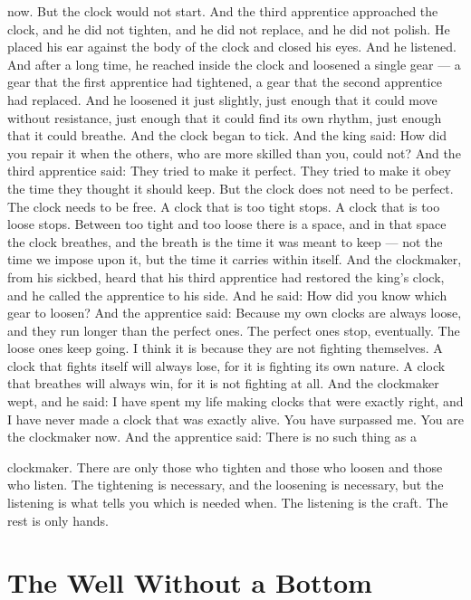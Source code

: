\documentclass[12pt,openany]{book}
\begin{document}
now. But the clock would not start. And the third apprentice approached the clock, and he did not tighten, and he did not replace, and he did not polish. He placed his ear against the body of the clock and closed his eyes. And he listened. And after a long time, he reached inside the clock and loosened a single gear --- a gear that the first apprentice had tightened, a gear that the second apprentice had replaced. And he loosened it just slightly, just enough that it could move without resistance, just enough that it could find its own rhythm, just enough that it could breathe. And the clock began to tick. And the king said: How did you repair it when the others, who are more skilled than you, could not? And the third apprentice said: They tried to make it perfect. They tried to make it obey the time they thought it should keep. But the clock does not need to be perfect. The clock needs to be free. A clock that is too tight stops. A clock that is too loose stops. Between too tight and too loose there is a space, and in that space the clock breathes, and the breath is the time it was meant to keep --- not the time we impose upon it, but the time it carries within itself. And the clockmaker, from his sickbed, heard that his third apprentice had restored the king's clock, and he called the apprentice to his side. And he said: How did you know which gear to loosen? And the apprentice said: Because my own clocks are always loose, and they run longer than the perfect ones. The perfect ones stop, eventually. The loose ones keep going. I think it is because they are not fighting themselves. A clock that fights itself will always lose, for it is fighting its own nature. A clock that breathes will always win, for it is not fighting at all. And the clockmaker wept, and he said: I have spent my life making clocks that were exactly right, and I have never made a clock that was exactly alive. You have surpassed me. You are the clockmaker now. And the apprentice said: There is no such thing as a


clockmaker. There are only those who tighten and those who loosen and those who listen. The tightening is necessary, and the loosening is necessary, but the listening is what tells you which is needed when. The listening is the craft. The rest is only hands.


\chapter{The Well Without a Bottom}
\end{document}
